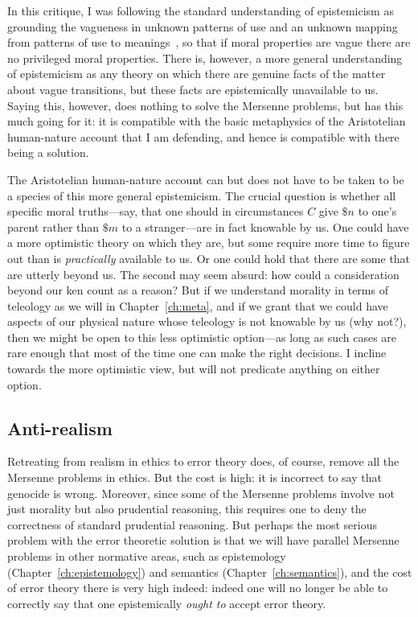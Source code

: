 In this critique, I was following the standard understanding of epistemicism as grounding the vagueness in unknown
patterns of use and an unknown mapping from patterns of use to meanings~\parencite[pp.~231--232]{WilliamsonVagueness}, so that if moral properties are vague there are no privileged moral properties. There is, however, a more general understanding of epistemicism as
any theory on which there are genuine facts of the matter about vague transitions, but these facts are epistemically unavailable to us. Saying this, however, does nothing to solve the Mersenne problems, but has this much going for 
it: it is compatible with the basic metaphysics of the Aristotelian human-nature account that I am defending, and 
hence is compatible with there being a solution. 

The Aristotelian human-nature account can but does not have to be taken to be a species of this more general
epistemicism. The crucial question is whether all specific moral truths---say, that one should in circumstances
$C$ give $\$ n$ to one's parent rather than $\$ m$ to a stranger---are in fact knowable by us. One could have a 
more optimistic theory on which they are, but some require more time to figure out than is \textit{practically}
available to us. Or one could hold that there are some that are utterly beyond us. The second may seem absurd:
how could a consideration beyond our ken count as a reason? But if we understand morality in terms of teleology
as we will in Chapter~\ref{ch:meta}, and if we grant that we could have aspects of our physical nature whose teleology is
not knowable by us (why not?), then we might be open to this less optimistic option---as long as such cases are
rare enough that most of the time one can make the right decisions. I incline towards the more optimistic view,
but will not predicate anything on either option.

\subsection{Anti-realism}
Retreating from realism in ethics to error theory does, of course, remove all the Mersenne problems in ethics. But the
cost is high: it is incorrect to say that genocide is wrong. Moreover, since some of the Mersenne problems involve not
just morality but also prudential reasoning, this requires one to deny the correctness of standard prudential reasoning.
But perhaps the most serious problem with the error theoretic solution is that we will have parallel Mersenne problems
in other normative areas, such as epistemology (Chapter~\ref{ch:epistemology}) and semantics (Chapter~\ref{ch:semantics}), and the cost of error theory 
there is very high indeed: indeed one will no longer  be able to correctly say that one epistemically \textit{ought to} accept error theory.

